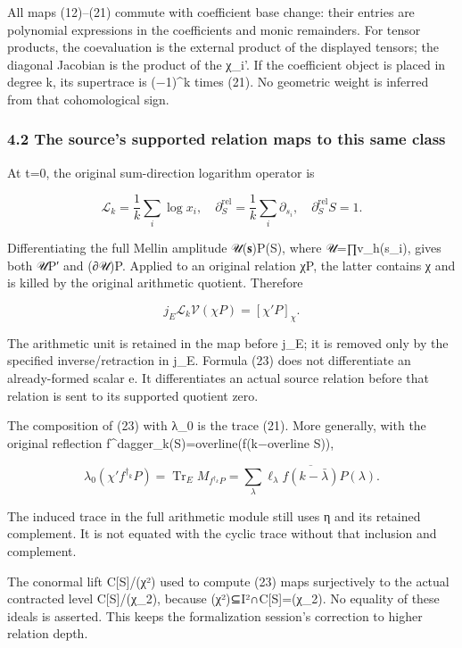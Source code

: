 All maps (12)--(21) commute with coefficient base change: their entries are polynomial expressions in the coefficients and monic remainders. For tensor products, the coevaluation is the external product of the displayed tensors; the diagonal Jacobian is the product of the χ\_i'. If the coefficient object is placed in degree k, its supertrace is (−1)\^{}k times (21). No geometric weight is inferred from that cohomological sign.

\subsubsection{4.2 The source's supported relation maps to this same class}\label{endpoint-sga_trace_period--the-sources-supported-relation-maps-to-this-same-class}

At t=0, the original sum-direction logarithm operator is

\[
\mathscr L_k=\frac1k\sum_i\log x_i,
\quad
\partial_S^{\mathrm{rel}}=\frac1k\sum_i\partial_{s_i},
\quad\partial_S^{\mathrm{rel}}S=1.
\tag{22}
\]

Differentiating the full Mellin amplitude 𝒰(𝐬)P(S), where 𝒰=∏v\_h(s\_i), gives both 𝒰P′ and (∂𝒰)P. Applied to an original relation χP, the latter contains χ and is killed by the original arithmetic quotient. Therefore

\[
\boxed{j_E\mathscr L_k\mathcal V(\chi P)=[\chi'P]_\chi.}
\tag{23}
\]

The arithmetic unit is retained in the map before j\_E; it is removed only by the specified inverse/retraction in j\_E. Formula (23) does not differentiate an already-formed scalar e. It differentiates an actual source relation before that relation is sent to its supported quotient zero.

The composition of (23) with λ\_0 is the trace (21). More generally, with the original reflection f\^{}dagger\_k(S)=overline(f(k−overline S)),

\[
\lambda_0(\chi' f^{\dagger_k}P)
 =\operatorname{Tr}_E M_{f^{\dagger_k}P}
 =\sum_\lambda\ell_\lambda\overline{f(k-\bar\lambda)}P(\lambda).
\tag{24}
\]

The induced trace in the full arithmetic module still uses η and its retained complement. It is not equated with the cyclic trace without that inclusion and complement.

The conormal lift C{[}S{]}/(χ²) used to compute (23) maps surjectively to the actual contracted level C{[}S{]}/(χ\_2), because (χ²)⊆I²∩C{[}S{]}=(χ\_2). No equality of these ideals is asserted. This keeps the formalization session's correction to higher relation depth.

